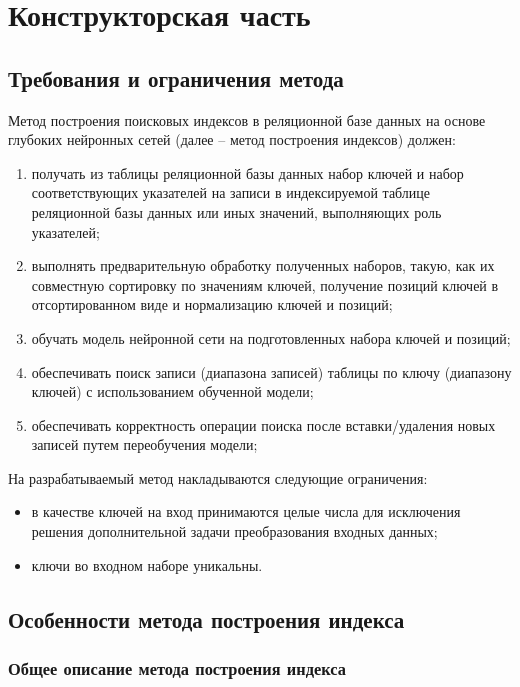 \chapter{\label{design}Конструкторская часть}

\section{Требования и ограничения метода}

Метод построения поисковых индексов в реляционной базе данных на основе глубоких
нейронных сетей (далее – метод построения индексов) должен:

\begin{enumerate}
    \item получать из таблицы реляционной базы данных набор ключей и набор
        соответствующих указателей на записи в индексируемой таблице реляционной
        базы данных или иных значений, выполняющих роль указателей;
    \item выполнять предварительную обработку полученных наборов, такую, как их
        совместную сортировку по значениям ключей, получение позиций ключей в
        отсортированном виде и нормализацию ключей и позиций;
    \item обучать модель нейронной сети на подготовленных набора ключей и
        позиций;
    \item обеспечивать поиск записи (диапазона записей) таблицы по ключу
        (диапазону ключей) с использованием обученной модели;
    \item обеспечивать корректность операции поиска после вставки/удаления новых
        записей путем переобучения модели;
\end{enumerate}

На разрабатываемый метод накладываются следующие ограничения:

\begin{itemize}
    \item в качестве ключей на вход принимаются целые числа для исключения
        решения дополнительной задачи преобразования входных данных;
    \item ключи во входном наборе уникальны.
\end{itemize}

\section{Особенности метода построения индекса}

\subsection{Общее описание метода построения индекса}

